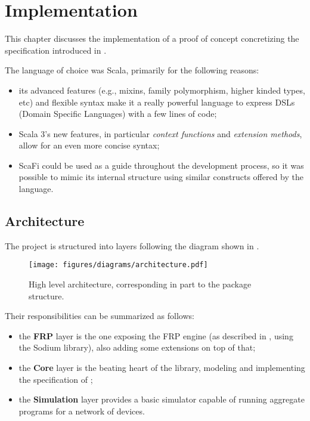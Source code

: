 \chapter{Implementation}
\label{chap:implementation}

This chapter discusses the implementation of a proof of concept concretizing the specification introduced in .

The language of choice was Scala, primarily for the following reasons:
%
\begin{itemize}
    \item its advanced features (e.g., mixins, family polymorphism, higher kinded types, etc) and flexible syntax make it a really powerful language to express DSLs (Domain Specific Languages) with a few lines of code;
    \item Scala 3's new features, in particular \textit{context functions} and \textit{extension methods}, allow for an even more concise syntax;
    \item ScaFi could be used as a guide throughout the development process, so it was possible to mimic its internal structure using similar constructs offered by the language.
\end{itemize}

\section{Architecture}
\label{sec:architecture}

The project is structured into layers following the diagram shown in .
%
\begin{figure}
    \centering
    \texttt{[image: figures/diagrams/architecture.pdf]}
    \caption{High level architecture, corresponding in part to the package structure.}
    \label{fig:architecture}
\end{figure}
%
Their responsibilities can be summarized as follows:
%
\begin{itemize}
    \item the \textbf{FRP} layer is the one exposing the FRP engine (as described in , using the Sodium library), also adding some extensions on top of that;
    \item the \textbf{Core} layer is the beating heart of the library, modeling and implementing the specification of ;
    \item the \textbf{Simulation} layer provides a basic simulator capable of running aggregate programs for a network of devices.
\end{itemize}

